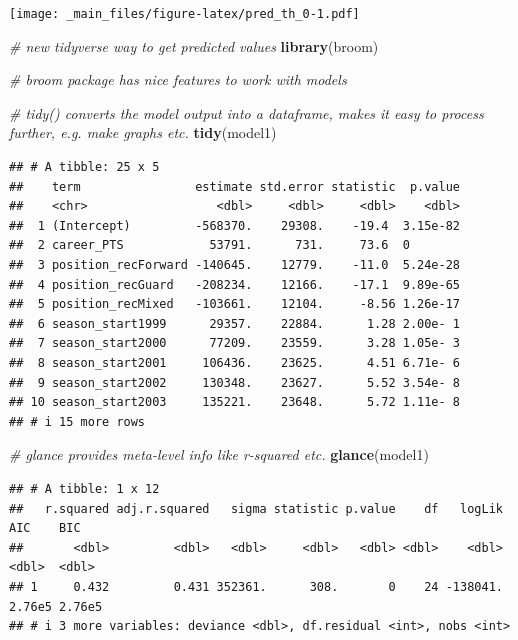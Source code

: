 \documentclass[
]{book}
\newenvironment{Shaded}{\begin{snugshade}}{\end{snugshade}}
\newcommand{\CommentTok}[1]{\textcolor[rgb]{0.56,0.35,0.01}{\textit{#1}}}
\newcommand{\FunctionTok}[1]{\textcolor[rgb]{0.13,0.29,0.53}{\textbf{#1}}}
\newcommand{\NormalTok}[1]{#1}
\begin{document}
\texttt{[image: \_main\_files/figure-latex/pred\_th\_0-1.pdf]}

\begin{Shaded}
\begin{Highlighting}[]
\CommentTok{\# new tidyverse way to get predicted values}
\FunctionTok{library}\NormalTok{(broom)}

\CommentTok{\# broom package has nice features to work with models}

\CommentTok{\# tidy() converts the model output into a dataframe, makes it easy to process further, e.g. make graphs etc.}
\FunctionTok{tidy}\NormalTok{(model1)}
\end{Highlighting}
\end{Shaded}

\begin{verbatim}
## # A tibble: 25 x 5
##    term                estimate std.error statistic  p.value
##    <chr>                  <dbl>     <dbl>     <dbl>    <dbl>
##  1 (Intercept)         -568370.    29308.    -19.4  3.15e-82
##  2 career_PTS            53791.      731.     73.6  0       
##  3 position_recForward -140645.    12779.    -11.0  5.24e-28
##  4 position_recGuard   -208234.    12166.    -17.1  9.89e-65
##  5 position_recMixed   -103661.    12104.     -8.56 1.26e-17
##  6 season_start1999      29357.    22884.      1.28 2.00e- 1
##  7 season_start2000      77209.    23559.      3.28 1.05e- 3
##  8 season_start2001     106436.    23625.      4.51 6.71e- 6
##  9 season_start2002     130348.    23627.      5.52 3.54e- 8
## 10 season_start2003     135221.    23648.      5.72 1.11e- 8
## # i 15 more rows
\end{verbatim}

\begin{Shaded}
\begin{Highlighting}[]
\CommentTok{\# glance provides meta{-}level info like r{-}squared etc.}
\FunctionTok{glance}\NormalTok{(model1)}
\end{Highlighting}
\end{Shaded}

\begin{verbatim}
## # A tibble: 1 x 12
##   r.squared adj.r.squared   sigma statistic p.value    df   logLik    AIC    BIC
##       <dbl>         <dbl>   <dbl>     <dbl>   <dbl> <dbl>    <dbl>  <dbl>  <dbl>
## 1     0.432         0.431 352361.      308.       0    24 -138041. 2.76e5 2.76e5
## # i 3 more variables: deviance <dbl>, df.residual <int>, nobs <int>
\end{verbatim}
\end{document}

